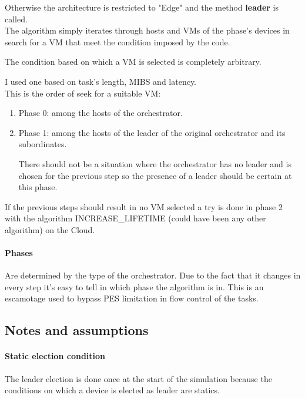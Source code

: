 \documentclass[12pt]{report}
\begin{document}
Otherwise the architecture is restricted to "Edge" and the method \textbf{leader} is called.\\

The algorithm simply iterates through hosts and VMs of the phase's devices in search for a VM that meet the condition imposed by the code.

The condition based on which a VM is selected is completely arbitrary.

I used one based on task's length, MIBS and latency.\\

This is the order of seek for a suitable VM:
\begin{enumerate}
	\item Phase 0: among the hosts of the orchestrator.
	\item Phase 1: among the hosts of the leader of the original orchestrator and its subordinates.
	
	There should not be a situation where the orchestrator has no leader and is chosen for the previous step so the presence of a leader should be certain at this phase.
\end{enumerate}

If the previous steps should result in no VM selected a try is done in phase 2 with the algorithm INCREASE\_LIFETIME (could have been any other algorithm) on the Cloud.\\

\paragraph{Phases}
Are determined by the type of the orchestrator.
Due to the fact that it changes in every step it's easy to tell in which phase the algorithm is in.
This is an escamotage used to bypass PES limitation in flow control of the tasks.\\

\subsection{Notes and assumptions}

\paragraph{Static election condition} The leader election is done once at the start of the simulation because the conditions on which a device is elected as leader are statics.
\end{document}
